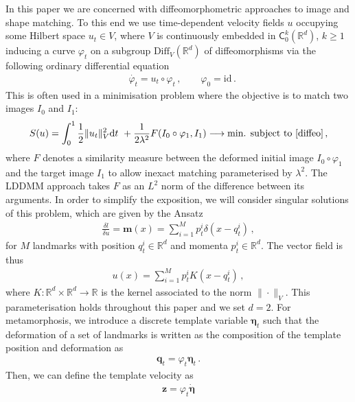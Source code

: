 \documentclass[runningheads]{llncs}
\newcommand{\half}{\frac 12}
\newcommand{\norm}[2]{\| #1 \|_{ #2 }}
\newcommand{\vnorm}[1]{\norm{ #1 }{V}}
\newcommand{\diff}[1]{\text{d} #1}
\newcommand{\Rd}{\mathbb{R}^{d}}
\begin{document}
In this paper we are concerned with diffeomorphometric approaches to image and
shape matching. To this end we use time-dependent velocity fields $u$ occupying
some Hilbert space $u_t \in V$, where $V$ is continuously embedded in
$\textsf{C}_0^k(\Rd)$, $k\geq 1$ inducing a curve $\varphi_t$ on a subgroup
$\text{Diff}_V(\Rd)$ of diffeomorphisms
\cite{arnold1966geometrie,younes2010shapes} via the following ordinary
differential equation
\begin{align}
& \dot{\varphi_t} = u_t \circ \varphi_t\, , \qquad  \varphi_0 = \text{id}\, . 
  \label{diffeo}
\end{align}
This is often used in a minimisation problem where the objective is to match two
images $I_0$ and $I_1$:
\begin{align}
  S(u) = \int_0^1 \half\vnorm{u_t}^2 \diff{t} + \frac{1}{2\lambda^2}
  F(I_0\circ\varphi_1, I_1)\longrightarrow \text{min. subject to \eqref{diffeo}}\, , \label{E-def}
\end{align}
where $F$ denotes a similarity measure between the deformed initial image
$I_0\circ \varphi_1$ and the target image $I_1$ to allow inexact matching
parameterised by $\lambda^2$. The LDDMM approach takes $F$ as an $L^2$ norm of
the difference between its arguments. In order to simplify the exposition, we
will consider singular solutions of this problem, which are given by the Ansatz
\begin{align}
  \frac{\delta l}{\delta u} = \mathbf m(x) = \sum_{i=1}^M p_t^i \delta(x-q_t^i)\,, 
\end{align}
for $M$ landmarks with position $q_t^i\in \Rd$ and momenta $p_t^i \in \Rd$.
The vector field is thus 
\begin{align}
  u(x) = \sum_{i=1}^M p_t^i K(x-q_t^i)\,, 
  \label{u-def}
\end{align}
where $K:\mathbb R^d\times \mathbb R^d\to \mathbb R$ is the kernel associated to
the norm $\|\cdot \|_V$. This parameterisation holds throughout this paper and
we set $d=2$. For metamorphosis, we introduce a discrete template variable
$\boldsymbol \eta_t$ such that the deformation of a set of landmarks is written
as the composition of the template position and deformation as
\begin{align}
  \mathbf q_t = \varphi_t \boldsymbol \eta_t\, . 
  \label{q_t}
\end{align}
Then, we can define the template velocity as 
\begin{align}
  \mathbf z = \varphi_t \dot {\boldsymbol \eta}
  \label{z_eta}
\end{align}
\end{document}
